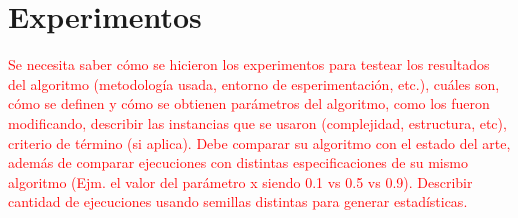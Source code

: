 \section{Experimentos}

\textcolor{red}{Se necesita saber cómo se hicieron los experimentos para testear los resultados del algoritmo (metodología usada, entorno de esperimentación, etc.), cuáles son, cómo se definen y cómo se obtienen parámetros del algoritmo, como los fueron modificando, describir las instancias que se usaron (complejidad, estructura, etc), criterio de término (si aplica). Debe comparar su algoritmo con el estado del arte, además de comparar ejecuciones con distintas especificaciones de su mismo algoritmo (Ejm. el valor del parámetro x siendo 0.1 vs 0.5 vs 0.9). Describir cantidad de ejecuciones usando semillas distintas para generar estadísticas.}
